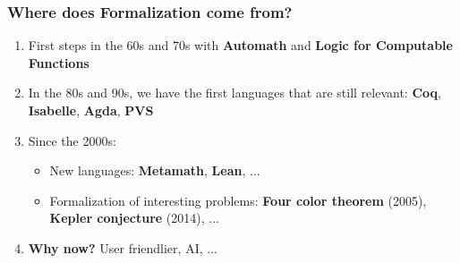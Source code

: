 \documentclass{beamer}
\theoremstyle{definition}
\theoremstyle{remark}
\begin{document}
\begin{frame}
	\frametitle{Where does Formalization come from?}
	\begin{enumerate}
		\item First steps in the 60s and 70s with \textbf{Automath} and \textbf{Logic for Computable Functions} 
		\item In the 80s and 90s, we have the first languages that are still relevant: \textbf{Coq}, \textbf{Isabelle}, \textbf{Agda}, \textbf{PVS}
		\item Since the 2000s: 
		\begin{itemize}
		 \item New languages: \textbf{Metamath}, \textbf{Lean}, ...
		 \item Formalization of interesting problems: \textbf{Four color theorem} (2005), \textbf{Kepler conjecture} (2014), ...
		\end{itemize}
	 \item \textbf{Why now?} User friendlier, AI, ... 
	\end{enumerate}
\end{frame}
\end{document}
